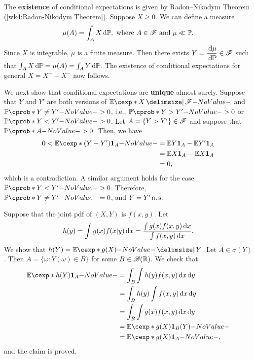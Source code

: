 \documentclass[12pt]{article}
\begin{document}
The \textbf{existence} of conditional expectations is given by Radon–Nikodym Theorem (\cref{wk4:Radon-Nikodym Theorem}). Suppose $X\geq0$. We can define a measure
\begin{align*}
\mu(A)= \int_A X\ud \P, \text{ where $A\in\scF$ and } \mu \ll \P.
\end{align*}
Since $X$ is integrable, $\mu$ is a finite measure. Then there exists $Y= \dfrac{\ud \mu}{\ud \P} \in \scF$ such that $\int_A X\ud \P=\mu(A)=\int_A Y \ud \P$. The existence of conditional expectations for general $X = X^+-X^-$ now follows. 

We next show that conditional expectations are \textbf{unique} almost surely. Suppose that $Y$ and $Y'$ are both versions of $\E [X \given \scF]$ and $\P (Y\neq Y')>0$, i.e., $\P (Y> Y')>0$ or $\P (Y< Y')>0$. Let $A=\{Y>Y'\}\in \mathscr{F}$ and suppose that $\P(A)>0$. Then, we have
\begin{align*}
0<\E[(Y-Y')\indicatore{A}] &= \E Y\indicatore{A}-\E Y'\indicatore{A}\\
&=\E X\indicatore{A} -\E X\indicatore{A}\\
&= 0, 
\end{align*}
which is a contradiction. A similar argument holds for the case $\P (Y< Y')>0$. Therefore, $\P (Y\neq Y')=0$, and $Y=Y' \operatorname{a.s.}$


\begin{Example}\label{wk12:ex:jointpdf}
Suppose that the joint pdf of $(X,Y)$ is $f(x,y)$. Let 
\begin{align*}
h(y)=\int g(x)f(x|y)\,\mathrm{d} x =\frac{\int g(x)f(x,y)\,\mathrm{d} x}{\int f(x,y) \,\mathrm{d} x}.
\end{align*}
We show that $h(Y)=\E[g(X)]{Y}$. Let $A \in \sigma(Y)$. Then $A=\{\omega:Y(\omega)\in B\}$ for some $B \in \mathscr{B}(\mathbb{R})$. We check that
\begin{align*}
\E[h(Y)\indicatore{A}]
&=\int_B \int h(y) f(x,y)\ud x \ud y\\
&=\int_B h(y) \int f(x,y)\ud x \ud y\\
&=\int_B \int g(x)f(x,y)\ud x \ud y\\
&=\E [g(X)\indicatore{B}(Y)]\\
&=\E [g(X)\indicatore{A}],
\end{align*}
and the claim is proved.
\end{Example}
\end{document}
